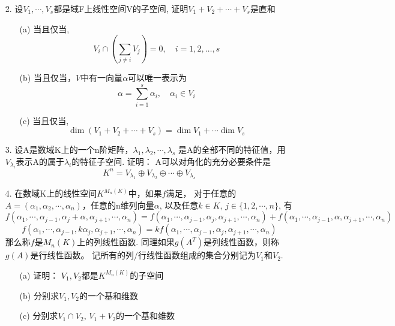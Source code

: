 \begin{itemize}
  \item[2.] 设$V_1, \cdots, V_s$都是域F上线性空间V的子空间,
  证明$V_1 + V_2 + \cdots + V_s$是直和
  \begin{itemize} 
    \item[(a)] 当且仅当,
    $$V_i \cap \left(\sum_{j\ne i} V_j \right) = 0, \quad i=1,2,\dots,s$$
    \item[(b)] 当且仅当，$V$中有一向量$\alpha$可以唯一表示为
    $$\alpha = \sum_{i=1}^s \alpha_i, \quad \alpha_i \in V_i$$
    \item[(c)] 当且仅当,
    $$\dim(V_1 + V_2 + \cdots + V_s) = \dim V_1 + \cdots \dim V_s$$ 
  \end{itemize}
\end{itemize}
\vspace{3cm}

\begin{itemize}
  \item[3.] 设A是数域K上的一个n阶矩阵，$\lambda_1, \lambda_2, \cdots, \lambda_s$
  是A的全部不同的特征值，用$V_{\lambda_i}$表示A的属于$\lambda_i$的特征子空间. 证明：
  A可以对角化的充分必要条件是
  $$K^n = V_{\lambda_1} \oplus V_{\lambda_2} \oplus \cdots \oplus V_{\lambda_s}$$
\end{itemize}
\vspace{1cm}

\begin{itemize}
  \item[4.] 在数域K上的线性空间$K^{M_n(K)}$中，如果$f$满足，
  对于任意的$A=(\alpha_1, \alpha_2,\cdots, \alpha_n)$，任意的n维列向量$\alpha$, 以及任意$k\in K$, $j\in \{1,2,\cdots, n\}$,
  有 
  $$f(\alpha_1, \cdots, \alpha_{j-1}, \alpha_{j} + \alpha, \alpha_{j+1}, \cdots, \alpha_n)
  = f(\alpha_1, \cdots, \alpha_{j-1}, \alpha_{j}, \alpha_{j+1}, \cdots, \alpha_n) + 
    f(\alpha_1, \cdots, \alpha_{j-1}, \alpha, \alpha_{j+1}, \cdots, \alpha_n)$$
  $$f(\alpha_1, \cdots, \alpha_{j-1}, k\alpha_{j}, \alpha_{j+1}, \cdots, \alpha_n)
  = kf(\alpha_1, \cdots, \alpha_{j-1}, \alpha_{j}, \alpha_{j+1}, \cdots, \alpha_n)
  $$
  那么称$f$是$M_n(K)$上的列线性函数. 同理如果$g(A^T)$是列线性函数，则称$g(A)$是行线性函数。
  记所有的列/行线性函数组成的集合分别记为$V_1$和$V_2$.
  \begin{itemize} 
    \item[(a)] 证明： $V_1, V_2$都是$K^{M_n(K)}$的子空间
    \item[(b)] 分别求$V_1, V_2$的一个基和维数
    \item[(c)] 分别求$V_1 \cap V_2,\,V_1 + V_2$的一个基和维数 
  \end{itemize}
\end{itemize}
\vspace{6cm}

